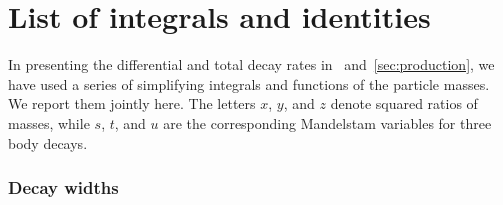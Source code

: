 \clearpage
\chapter{List of integrals and identities}
\label{app:integrals}

In presenting the differential and total decay rates in~ and~\ref{sec:production}, %
we have used a series of simplifying integrals and functions of the particle masses.
We report them jointly here.
The letters $x$, $y$, and $z$ denote squared ratios of masses, while $s$, $t$, and $u$ are the corresponding Mandelstam variables for three body decays.

\subsection{Decay widths}

